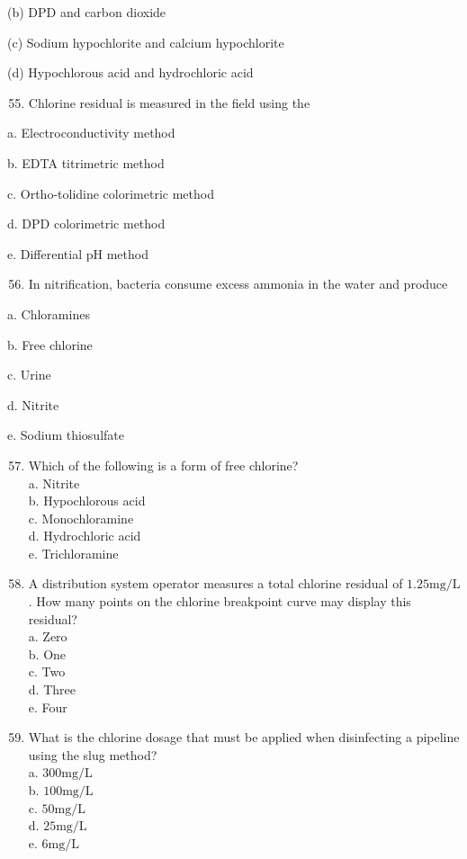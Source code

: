 \documentclass[10pt]{article}
\begin{document}
\begin{enumerate}
\begin{enumerate}
(b) DPD and carbon dioxide

(c) Sodium hypochlorite and calcium hypochlorite

(d) Hypochlorous acid and hydrochloric acid

\begin{enumerate}
  \setcounter{enumi}{54}
  \item Chlorine residual is measured in the field using the
\end{enumerate}

a. Electroconductivity method

b. EDTA titrimetric method

c. Ortho-tolidine colorimetric method

d. DPD colorimetric method

e. Differential $\mathrm{pH}$ method

\begin{enumerate}
  \setcounter{enumi}{55}
  \item In nitrification, bacteria consume excess ammonia in the water and produce
\end{enumerate}

a. Chloramines

b. Free chlorine

c. Urine

d. Nitrite

e. Sodium thiosulfate

\begin{enumerate}
  \setcounter{enumi}{56}
  \item Which of the following is a form of free chlorine?\\
a. Nitrite\\
b. Hypochlorous acid\\
c. Monochloramine\\
d. Hydrochloric acid\\
e. Trichloramine\\

  \item A distribution system operator measures a total chlorine residual of $1.25 \mathrm{mg} / \mathrm{L}$. How many points on the chlorine breakpoint curve may display this residual?\\
a. Zero\\
b. One\\
c. Two\\
d. Three\\
e. Four\\

  \item What is the chlorine dosage that must be applied when disinfecting a pipeline using the slug method?\\
a. $300 \mathrm{mg} / \mathrm{L}$\\
b. $100 \mathrm{mg} / \mathrm{L}$\\
c. $50 \mathrm{mg} / \mathrm{L}$\\
d. $25 \mathrm{mg} / \mathrm{L}$\\
e. $6 \mathrm{mg} / \mathrm{L}$


\end{enumerate}
\end{enumerate}
\end{enumerate}
\end{document}
